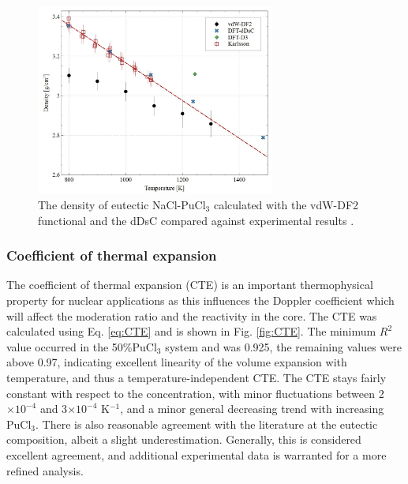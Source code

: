 \documentclass[review]{elsarticle}
\begin{document}
\begin{figure}[h!]
\centering
\includegraphics[width=0.7\textwidth]{density_comp.jpg}
\caption{The density of eutectic NaCl-PuCl$_3$ calculated with the vdW-DF2 functional and the dDsC compared against experimental results \cite{karlsson2022synthesis}.}
\label{fig:eutectic_density}
\end{figure}

\subsubsection{Coefficient of thermal expansion}

The coefficient of thermal expansion (CTE) is an important thermophysical property for nuclear applications as this influences the Doppler coefficient which will affect the moderation ratio and the reactivity in the core. The CTE was calculated using Eq. \ref{eq:CTE} and is shown in Fig. \ref{fig:CTE}. The minimum $R^2$ value occurred in the 50\%PuCl$_3$ system and was 0.925, the remaining values were above 0.97, indicating excellent linearity of the volume expansion with temperature, and thus a temperature-independent CTE. The CTE stays fairly constant with respect to the concentration, with minor fluctuations between 2$\times10^{-4}$ and 3$\times10^{-4}$ K$^{-1}$, and a minor general decreasing trend with increasing PuCl$_3$. There is also reasonable agreement with the literature \cite{karlsson2022synthesis} at the eutectic composition, albeit a slight underestimation. Generally, this is considered excellent agreement, and additional experimental data is warranted for a more refined analysis. 
\end{document}
